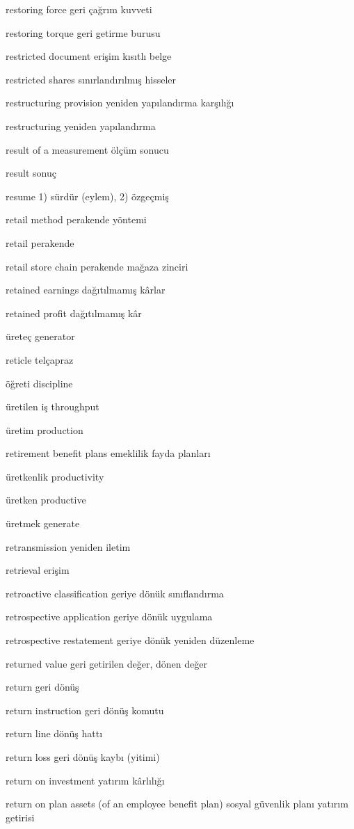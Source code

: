\documentclass[12pt,fleqn]{article}\usepackage{../../common}
\begin{document}
restoring force geri çağrım kuvveti

restoring torque geri getirme burusu

restricted document erişim kısıtlı belge

restricted shares sınırlandırılmış hisseler

restructuring provision yeniden yapılandırma karşılığı

restructuring yeniden yapılandırma

result of a measurement ölçüm sonucu

result sonuç

resume 1) sürdür (eylem), 2) özgeçmiş

retail method perakende yöntemi

retail perakende

retail store chain perakende mağaza zinciri

retained earnings dağıtılmamış kârlar

retained profit dağıtılmamış kâr

üreteç generator

reticle telçapraz

öğreti discipline

üretilen iş throughput

üretim production

retirement benefit plans emeklilik fayda planları

üretkenlik productivity

üretken productive

üretmek generate

retransmission yeniden iletim

retrieval erişim

retroactive classification geriye dönük sınıflandırma

retrospective application geriye dönük uygulama

retrospective restatement geriye dönük yeniden düzenleme 

returned value geri getirilen değer, dönen değer

return geri dönüş

return instruction geri dönüş komutu

return line dönüş hattı

return loss geri dönüş kaybı (yitimi)

return on investment yatırım kârlılığı

return on plan assets (of an employee benefit plan) sosyal güvenlik planı yatırım getirisi
\end{document}
